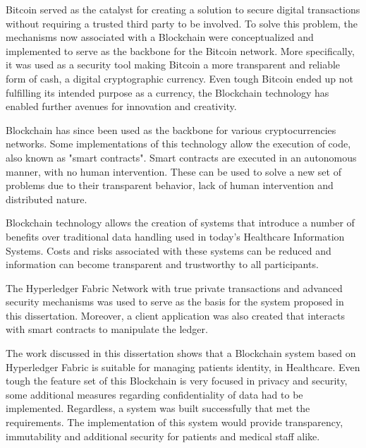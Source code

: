 \begin{tueABSTRACT}

  Bitcoin served as the catalyst for creating a solution to secure digital
  transactions without requiring a trusted third party to be involved. To solve
  this problem, the mechanisms now associated with a Blockchain were
  conceptualized and implemented to serve as the backbone for the Bitcoin
  network. More specifically, it was used as a security tool making Bitcoin a
  more transparent and reliable form of cash, a digital cryptographic currency.
  Even tough Bitcoin ended up not fulfilling its intended purpose as a
  currency, the Blockchain technology has enabled further avenues for
  innovation and creativity.

  Blockchain has since been used as the backbone for various cryptocurrencies
  networks. Some implementations of this technology allow the execution of
  code, also known as "smart contracts". Smart contracts are executed in an
  autonomous manner, with no human intervention. These can be used to solve a
  new set of problems due to their transparent behavior, lack of human
  intervention and distributed nature. 

  Blockchain technology allows the creation of systems that introduce a number
  of benefits over traditional data handling used in today's Healthcare
  Information Systems. Costs and risks associated with these systems can be
  reduced and information can become transparent and trustworthy to all
  participants.
  
  The Hyperledger Fabric Network with true private transactions and advanced
  security mechanisms was used to serve as the basis for the system proposed in
  this dissertation. Moreover, a client application was also created that
  interacts with smart contracts to manipulate the ledger.
  
  The work discussed in this dissertation shows that a Blockchain system based
  on Hyperledger Fabric is suitable for managing patients identity, in
  Healthcare. Even tough the feature set of this Blockchain is very focused in
  privacy and security, some additional measures regarding confidentiality of
  data had to be implemented.  Regardless, a system was built successfully that
  met the requirements. The implementation of this system would provide
  transparency, immutability and additional security for patients and medical
  staff alike. 

\end{tueABSTRACT}
